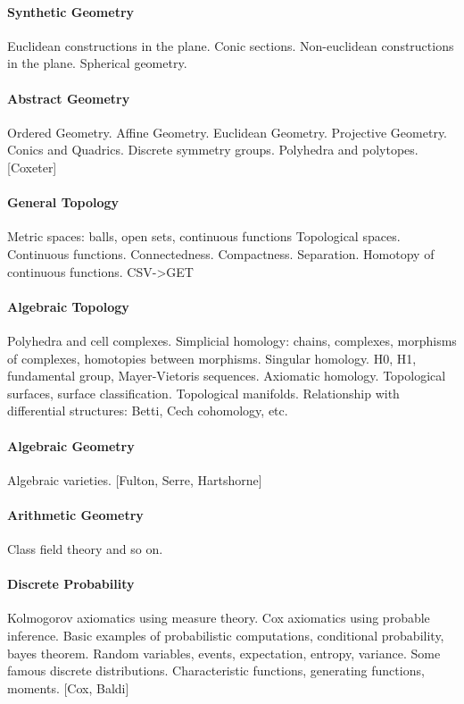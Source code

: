 \paragraph{Synthetic Geometry}
Euclidean constructions in the plane.
Conic sections.
Non-euclidean constructions in the plane.
Spherical geometry.

\paragraph{Abstract Geometry}
Ordered Geometry.
Affine Geometry.
Euclidean Geometry.
Projective Geometry.
Conics and Quadrics.
Discrete symmetry groups.
Polyhedra and polytopes.
[Coxeter]
{}

\paragraph{General Topology}
Metric spaces: balls, open sets, continuous functions
Topological spaces.  Continuous functions.
Connectedness.  Compactness.  Separation.
Homotopy of continuous functions.
{CSV->GET}

\paragraph{Algebraic Topology}
Polyhedra and cell complexes.
Simplicial homology: chains, complexes, morphisms of complexes, homotopies
between morphisms.
Singular homology.  H0, H1, fundamental group, Mayer-Vietoris sequences.
Axiomatic homology.
Topological surfaces, surface classification.  Topological manifolds.
Relationship with differential structures: Betti, Cech cohomology, etc.

\paragraph{Algebraic Geometry}
Algebraic varieties.
[Fulton, Serre, Hartshorne]

\paragraph{Arithmetic Geometry}
Class field theory and so on.


\paragraph{Discrete Probability}
Kolmogorov axiomatics using measure theory.
Cox axiomatics using probable inference.
Basic examples of probabilistic computations, conditional probability, bayes
theorem.
Random variables, events, expectation, entropy, variance.
Some famous discrete distributions.
Characteristic functions, generating functions, moments.
[Cox, Baldi]

